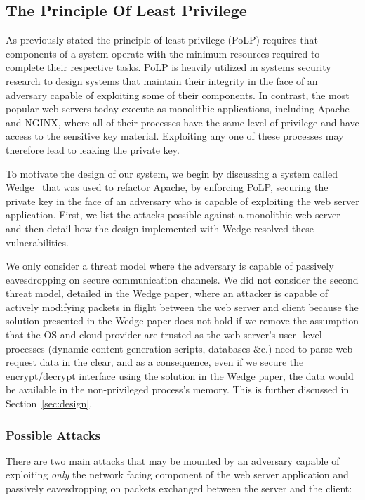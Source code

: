 \documentclass[../main.tex]{subfiles}
\begin{document}
     
\subsection{The Principle Of Least Privilege}     

As previously stated the principle of least privilege (PoLP) requires that
components of a system operate with the minimum resources required to complete
their respective tasks. PoLP is heavily utilized in systems security research to
design systems that maintain their integrity in the face of an adversary capable
of exploiting some of their components. In contrast, the most popular web
servers today execute as monolithic applications, including Apache and NGINX,
where all of their processes have the same level of privilege and have access to
the sensitive key material. Exploiting any one of these processes may therefore
lead to leaking the private key.

To motivate the design of our system, we begin by discussing a system called
Wedge~\cite{Bittau08} that was used to refactor Apache, by enforcing PoLP,
securing the private key in the face of an adversary who is capable of
exploiting the web server application. First, we list the attacks possible
against a monolithic web server and then detail how the design implemented
with Wedge resolved these vulnerabilities. 

We only consider a threat model where the adversary is capable of passively
eavesdropping on secure communication channels. We did not consider the second
threat model, detailed in the Wedge paper, where an attacker is capable of
actively modifying packets in flight between the web server and client because
the solution presented in the Wedge paper does not hold if we remove the
assumption that the OS and cloud provider are trusted as the web server's user-
level processes (dynamic content generation scripts, databases \&c.) need to
parse web request data in the clear, and as a consequence, even if we secure the
encrypt/decrypt interface using the solution in the Wedge paper, the data would
be available in the non-privileged process's memory. This is further discussed
in  Section~\ref{sec:design}.

\subsubsection*{Possible Attacks}

There are two main attacks that may be mounted by an adversary capable of
exploiting \textit{only} the network facing component of the web server
application and passively eavesdropping on packets exchanged between the server
and the client:
\end{document}
